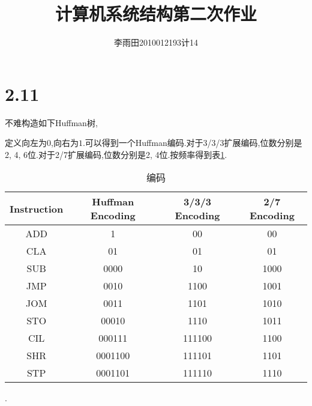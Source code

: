 \documentclass[adobefonts, nocap]{ctexart}
\begin{document}
  \title{计算机系统结构第二次作业}
  \author{李雨田\hspace{1em}2010012193\hspace{1em}计14}
  \maketitle
  \section*{2.11}
    不难构造如下Huffman树,
    \begin{figure}[h]
      \centering
    \end{figure}

    定义向左为$0$,向右为$1$.可以得到一个Huffman编码.对于3/3/3扩展编码,位数分别是2, 4, 6位.对于2/7扩展编码,位数分别是2, 4位.按频率得到表\ref{t1}.
    \begin{table}[h]
      \centering
      \caption{编码}
      \label{t1}
      \begin{tabular}{c||c|c|c}
        Instruction & Huffman Encoding & 3/3/3 Encoding & 2/7 Encoding \\
        \hline
        \hline
        ADD & 1 & 00 & 00 \\
        \hline
        CLA & 01 & 01 & 01 \\
        \hline
        SUB & 0000 & 10 & 1000 \\
        \hline
        JMP & 0010 & 1100 & 1001 \\
        \hline
        JOM & 0011 & 1101 & 1010 \\
        \hline
        STO & 00010 & 1110 & 1011 \\
        \hline
        CIL & 000111 & 111100 & 1100 \\
        \hline
        SHR & 0001100 & 111101 & 1101 \\
        \hline
        STP & 0001101 & 111110 & 1110 \\
      \end{tabular}.
    \end{table}
\end{document}
